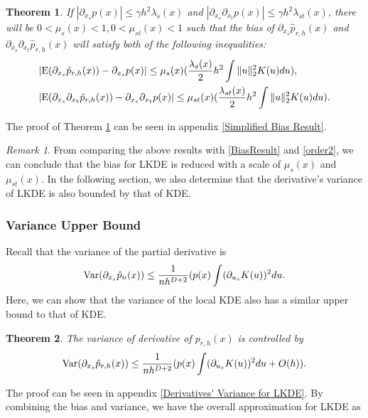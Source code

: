 \documentclass[aos,preprint]{imsart}
\newtheorem{theorem}{Theorem}[section]
\theoremstyle{remark}
\newtheorem*{remark}{Remark}
\begin{document}
\begin{theorem}\label{bias_theorem}
If $|\partial_{x_s} p(x)| \leq \gamma h^2 \lambda_s(x)$ and $|\partial_{x_s} \partial_{x_t} p(x)| \leq \gamma h^2 \lambda_{st}(x)$, there will be $0<\mu_s(x)<1,0<\mu_{st}(x)<1$ such that the bias of $\partial_ {x_s} \hat{p}_{r,h}(x)$ and $\partial_{x_s} \partial_{x_t}  \hat{p}_{r, h}(x)$ will satisfy both of the following inequalities:
\[
\begin{aligned}
&|{\rm E} (\partial_ {x_s} \hat{p}_{r,h}(x)) -\partial_{x_s} p(x)| \leq \mu_s(x)( \frac{ \lambda_s(x)}{2} h^2 \int \|u\|_2^2 K(u) du),\\
&|{\rm E} (\partial_{x_s} \partial_{x_t}  \hat{p}_{r, h}(x))-  \partial_{x_s} \partial_{x_t} p(x)| \leq  \mu_{st}(x) (\frac{\lambda_{st}(x)}{2} h^2 \int \|u\|_2^2 K(u) du).
\end{aligned}
\]
\end{theorem}
The proof of Theorem \ref{bias_theorem} can be seen in appendix \ref{Simplified Bias Result}.
\begin{remark}
From comparing the above results with \eqref{BiasResult} and \eqref{order2}, we can conclude that the bias for LKDE is reduced with a scale of $\mu_s(x)$ and $\mu_{st}(x)$. In the following section, we also determine that the derivative's variance of LKDE is also bounded by that of KDE. 
\end{remark}
\subsubsection{Variance Upper Bound}
Recall that the variance of the partial derivative is
\[
{{\rm Var}}(\partial_{x_s} \hat{p}_n(x)) \leq \frac{1}{n h^{D+2}}  (p(x) \int (\partial_{ u_s } K (u) )^2  du.
\] 
Here, we can show that the variance of the local KDE also has a similar upper bound to that of KDE.
\begin{theorem}{The variance of derivative of $p_{r,h}(x)$ is controlled by}
\[
{{\rm Var}}(\partial_{x_s} \hat{p}_{r,h}(x)) \leq \frac{1}{n h^{D+2}}  (p(x) \int (\partial_{ u_s } K (u) )^2   du + O(h)).
\]
\end{theorem}
The proof can be seen in appendix \ref{Derivatives' Variance for LKDE}. By combining the bias and variance, we have the overall approximation for LKDE as
\end{document}
